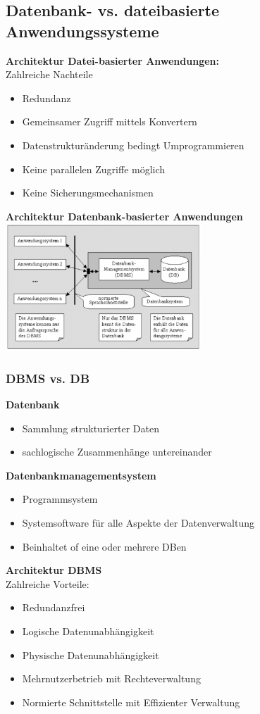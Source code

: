 \documentclass{scrreprt}
\newcommand\tab[1][1cm]{\hspace*{#1}}
\begin{document}
\subsection{Datenbank- vs. dateibasierte Anwendungssysteme}
\textbf{Architektur Datei-basierter Anwendungen:}
\\Zahlreiche Nachteile
\tab \begin{itemize}
  \item Redundanz
  \item Gemeinsamer Zugriff mittels Konvertern
  \item Datenstrukturänderung bedingt Umprogrammieren
  \item Keine parallelen Zugriffe möglich
  \item Keine Sicherungsmechanismen
\end{itemize}
\textbf{Architektur Datenbank-basierter Anwendungen}
\\\includegraphics[width=0.55\textwidth]{"graphics/Datenbank-Arch"}
\subsubsection{DBMS vs. DB}
\textbf{Datenbank}
\begin{itemize}
  \item Sammlung strukturierter Daten
  \item sachlogische Zusammenhänge untereinander
\end{itemize}
\textbf{Datenbankmanagementsystem}
\begin{itemize}
  \item Programmsystem
  \item Systemsoftware für alle Aspekte der Datenverwaltung
  \item Beinhaltet of eine oder mehrere DBen
\end{itemize}
\textbf{Architektur DBMS}
\\Zahlreiche Vorteile:
\begin{itemize}
  \item Redundanzfrei
  \item Logische Datenunabhängigkeit
  \item Physische Datenunabhängigkeit
  \item Mehrnutzerbetrieb mit Rechteverwaltung
  \item Normierte Schnittstelle mit Effizienter Verwaltung
\end{itemize}
\end{document}
